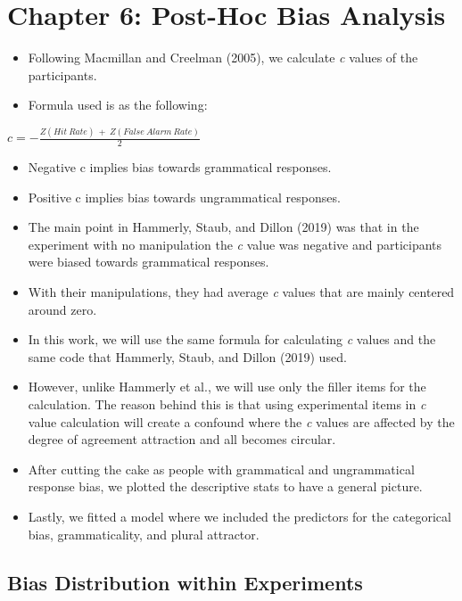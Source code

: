 \documentclass[
  10pt,
  english,
  doc,floatsintext]{apa6}
\providecommand{\tightlist}{%
  \setlength{\itemsep}{0pt}\setlength{\parskip}{0pt}}
\begin{document}
\newpage

\hypertarget{chapter-6-post-hoc-bias-analysis}{%
\section{Chapter 6: Post-Hoc Bias Analysis}\label{chapter-6-post-hoc-bias-analysis}}

\begin{itemize}
\tightlist
\item
  Following Macmillan and Creelman (2005), we calculate \emph{c} values of the participants.
\item
  Formula used is as the following:
\end{itemize}

\(c = - \frac{Z(Hit\ Rate)\ +\ Z(False\ Alarm\ Rate)}{2}\)

\begin{itemize}
\item
  Negative c implies bias towards grammatical responses.
\item
  Positive c implies bias towards ungrammatical responses.
\item
  The main point in Hammerly, Staub, and Dillon (2019) was that in the experiment with no manipulation the \emph{c} value was negative and participants were biased towards grammatical responses.
\item
  With their manipulations, they had average \emph{c} values that are mainly centered around zero.
\item
  In this work, we will use the same formula for calculating \emph{c} values and the same code that Hammerly, Staub, and Dillon (2019) used.
\item
  However, unlike Hammerly et al., we will use only the filler items for the calculation. The reason behind this is that using experimental items in \emph{c} value calculation will create a confound where the \emph{c} values are affected by the degree of agreement attraction and all becomes circular.
\item
  After cutting the cake as people with grammatical and ungrammatical response bias, we plotted the descriptive stats to have a general picture.
\item
  Lastly, we fitted a model where we included the predictors for the categorical bias, grammaticality, and plural attractor.
\end{itemize}

\hypertarget{bias-distribution-within-experiments}{%
\subsection{Bias Distribution within Experiments}\label{bias-distribution-within-experiments}}
\end{document}
